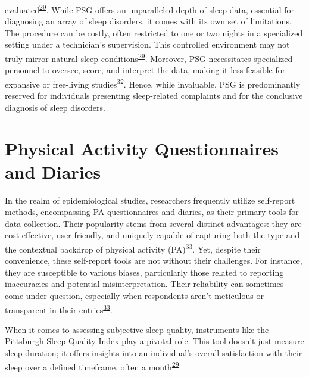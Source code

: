 \documentclass[
  9pt,
]{scrbook}
\begin{document}
evaluated\textsuperscript{\protect\hyperlink{ref-sadeh_2015}{29}}. While
PSG offers an unparalleled depth of sleep data, essential for diagnosing
an array of sleep disorders, it comes with its own set of limitations.
The procedure can be costly, often restricted to one or two nights in a
specialized setting under a technician's supervision. This controlled
environment may not truly mirror natural sleep
conditions\textsuperscript{\protect\hyperlink{ref-sadeh_2015}{29}}.
Moreover, PSG necessitates specialized personnel to oversee, score, and
interpret the data, making it less feasible for expansive or free-living
studies\textsuperscript{\protect\hyperlink{ref-girschik_validation_2012}{32}}.
Hence, while invaluable, PSG is predominantly reserved for individuals
presenting sleep-related complaints and for the conclusive diagnosis of
sleep disorders.

\hypertarget{physical-activity-questionnaires-and-diaries}{%
\section{Physical Activity Questionnaires and
Diaries}\label{physical-activity-questionnaires-and-diaries}}

In the realm of epidemiological studies, researchers frequently utilize
self-report methods, encompassing PA questionnaires and diaries, as
their primary tools for data collection. Their popularity stems from
several distinct advantages: they are cost-effective, user-friendly, and
uniquely capable of capturing both the type and the contextual backdrop
of physical activity
(PA)\textsuperscript{\protect\hyperlink{ref-westerterp_2009}{33}}. Yet,
despite their convenience, these self-report tools are not without their
challenges. For instance, they are susceptible to various biases,
particularly those related to reporting inaccuracies and potential
misinterpretation. Their reliability can sometimes come under question,
especially when respondents aren't meticulous or transparent in their
entries\textsuperscript{\protect\hyperlink{ref-westerterp_2009}{33}}.

When it comes to assessing subjective sleep quality, instruments like
the Pittsburgh Sleep Quality Index play a pivotal role. This tool
doesn't just measure sleep duration; it offers insights into an
individual's overall satisfaction with their sleep over a defined
timeframe, often a
month\textsuperscript{\protect\hyperlink{ref-sadeh_2015}{29}}.
\end{document}
